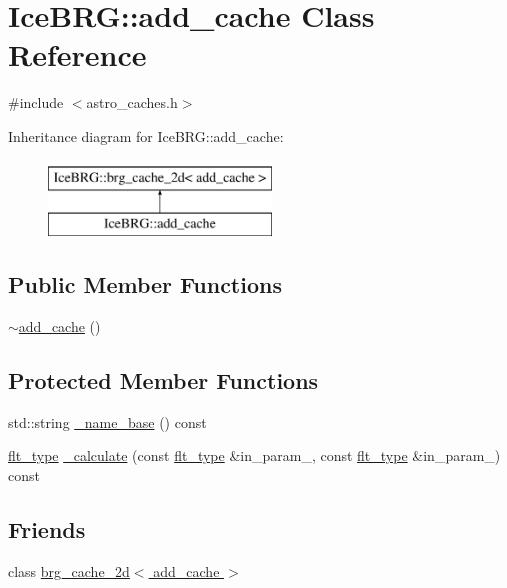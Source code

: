 \hypertarget{classIceBRG_1_1add__cache}{}\section{Ice\+B\+R\+G\+:\+:add\+\_\+cache Class Reference}
\label{classIceBRG_1_1add__cache}


{\ttfamily \#include $<$astro\+\_\+caches.\+h$>$}

Inheritance diagram for Ice\+B\+R\+G\+:\+:add\+\_\+cache\+:\begin{figure}[H]
\begin{center}
\leavevmode
\includegraphics[height=2.000000cm]{classIceBRG_1_1add__cache}
\end{center}
\end{figure}
\subsection*{Public Member Functions}
\begin{DoxyCompactItemize}
\item 
\hyperlink{classIceBRG_1_1add__cache_af08acb2ae5fbc6e933e76fbb5eb075d1}{$\sim$add\+\_\+cache} ()
\end{DoxyCompactItemize}
\subsection*{Protected Member Functions}
\begin{DoxyCompactItemize}
\item 
std\+::string \hyperlink{classIceBRG_1_1add__cache_a26ea452f7970b9a3e38c2f544dfca78e}{\+\_\+name\+\_\+base} () const 
\item 
\hyperlink{lib_2IceBRG__main_2common_8h_ad0f130a56eeb944d9ef2692ee881ecc4}{flt\+\_\+type} \hyperlink{classIceBRG_1_1add__cache_a9b231de4bf15e84a597e2d379daaadda}{\+\_\+calculate} (const \hyperlink{lib_2IceBRG__main_2common_8h_ad0f130a56eeb944d9ef2692ee881ecc4}{flt\+\_\+type} \&in\+\_\+param\+\_, const \hyperlink{lib_2IceBRG__main_2common_8h_ad0f130a56eeb944d9ef2692ee881ecc4}{flt\+\_\+type} \&in\+\_\+param\+\_) const 
\end{DoxyCompactItemize}
\subsection*{Friends}
\begin{DoxyCompactItemize}
\item 
class \hyperlink{classIceBRG_1_1add__cache_a5488840165a3177405ea84ef773fc1f5}{brg\+\_\+cache\+\_\+2d$<$ add\+\_\+cache $>$}
\end{DoxyCompactItemize}


